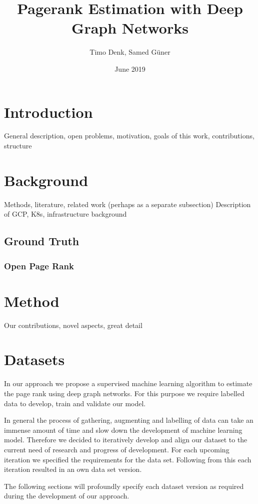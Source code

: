 \documentclass{article}
\title{Pagerank Estimation with Deep Graph Networks}
\author{Timo Denk, Samed Güner}
\date{June 2019}
\begin{document}
\maketitle

\section{Introduction}
General description, open problems, motivation, goals of this work, contributions, structure

\section{Background}
Methods, literature, related work (perhaps as a separate subsection)
Description of GCP, K8s, infrastructure background

\subsection{Ground Truth}
\subsubsection{Open Page Rank}
\label{OpenPageRank}

\section{Method}
Our contributions, novel aspects, great detail

\section{Datasets}
In our approach we propose a supervised machine learning algorithm to estimate the page rank using deep graph networks. For this purpose we require labelled data to develop, train and validate our model. 

In general the process of gathering, augmenting and labelling of data can take an immense amount of time and slow down the development of machine learning model. Therefore we decided to iteratively develop and align our dataset to the current need of research and progress of development. For each upcoming iteration we specified the requirements for the data set. Following from this each iteration resulted in an own data set version.

The following sections will profoundly specify each dataset version as required during the development of our approach.
\end{document}
